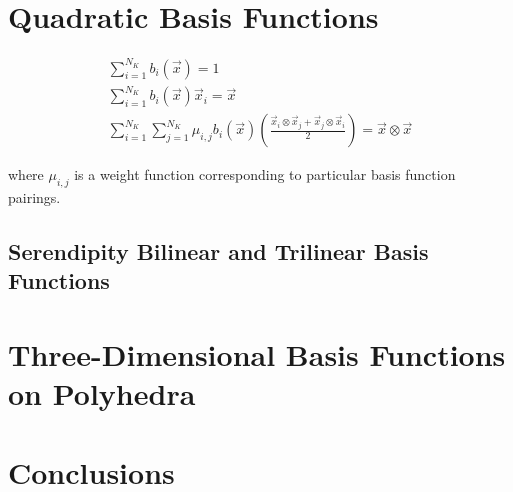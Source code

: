 \section{Quadratic Basis Functions}
\label{sec::BF_Quadratic}

\begin{gather}
	 \sum_{i=1}^{N_K} b_i (\vec{x})  =  1 \\
	\sum_{i=1}^{N_K} b_i(\vec{x}) \vec{x}_i  =  \vec{x} \\
	\sum_{i=1}^{N_K} \sum_{j=1}^{N_K} \mu _{i,j} b_i(\vec{x}) \left(   \frac{\vec{x}_i \otimes \vec{x}_j +\vec{x}_j \otimes \vec{x}_i }{2}  \right)  = \vec{x} \otimes \vec{x}
\label{eq::quadratic_interp_requirements}
\end{gather}

\noindent where $\mu_{i,j}$ is a weight function corresponding to particular basis function pairings.

\subsection{Serendipity Bilinear and Trilinear Basis Functions}
\label{sec::BF_Quadratic_BiLTriL}

\section{Three-Dimensional Basis Functions on Polyhedra}
\label{sec::BF_3D}

\section{Conclusions}
\label{sec::BF_Conclusions}









